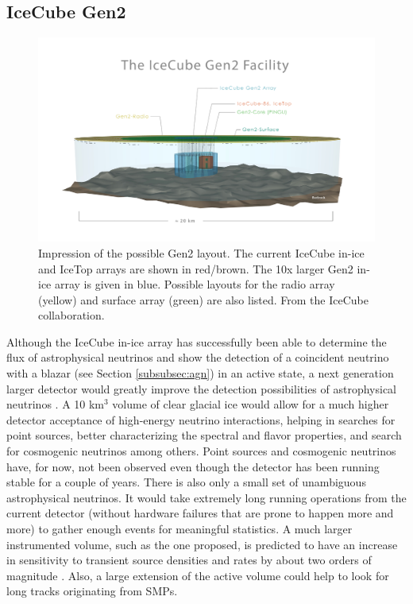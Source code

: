\subsection{IceCube Gen2}
\begin{figure}[ht]
\centering
\includegraphics[width=\textwidth]{chapter5/img/gen2_structure.jpg}
\caption{Impression of the possible Gen2 layout. The current IceCube in-ice and IceTop arrays are shown in red/brown. The 10x larger Gen2 in-ice array is given in blue. Possible layouts for the radio array (yellow) and surface array (green) are also listed. From the IceCube collaboration.%
}
\label{fig:gen2}
\end{figure}

\noindent Although the IceCube in-ice array has successfully been able to determine the flux of astrophysical neutrinos and show the detection of a coincident neutrino with a blazar (see Section \ref{subsubsec:agn}) in an active state, a next generation larger detector would greatly improve the detection possibilities of astrophysical neutrinos \cite{Blaufuss:2015muc}. A 10 km$^3$ volume of clear glacial ice would allow for a much higher detector acceptance of high-energy neutrino interactions, helping in searches for point sources, better characterizing the spectral and flavor properties, and search for cosmogenic neutrinos among others. Point sources and cosmogenic neutrinos have, for now, not been observed even though the detector has been running stable for a couple of years. There is also only a small set of unambiguous astrophysical neutrinos. It would take extremely long running operations from the current detector (without hardware failures that are prone to happen more and more) to gather enough events for meaningful statistics. A much larger instrumented volume, such as the one proposed, is predicted to have an increase in sensitivity to transient source densities and rates by about two orders of magnitude \cite{Ahlers:2014ioa}. Also, a large extension of the active volume could help to look for long tracks originating from SMPs.

